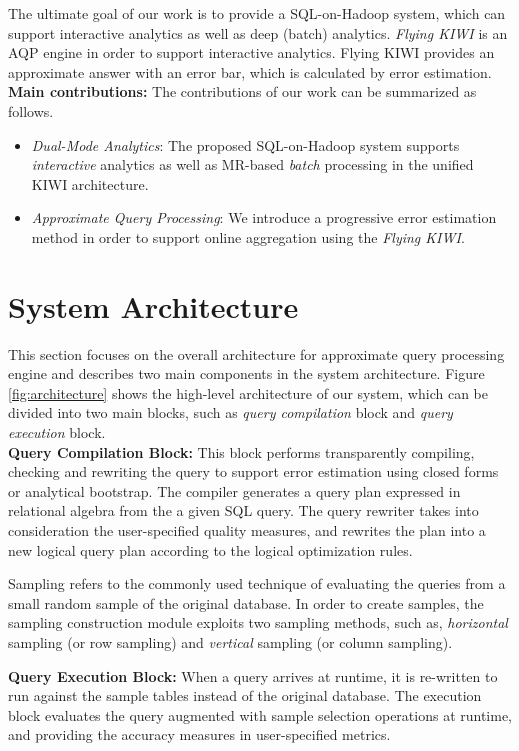 \documentclass{sig-alternate-05-2015}
\newcommand{\bi}{\begin{itemize}}
\newcommand{\ei}{\end{itemize}}
\newcommand{\ii}{\item}
\begin{document}
The ultimate goal of our work is to provide a SQL-on-Hadoop system, which can support interactive analytics as well as deep (batch) analytics. \textit{Flying KIWI} is an AQP engine in order to support interactive analytics. Flying KIWI provides an approximate answer with an error bar, which is calculated by error estimation. \\

\noindent
\textbf{Main contributions:} 
The contributions of our work can be summarized as follows. 
\bi
\ii \textit{Dual-Mode Analytics}: 
The proposed SQL-on-Hadoop system supports \textit{interactive} analytics as well as MR-based \textit{batch} processing in the unified KIWI architecture.
\ii \textit{Approximate Query Processing}: 
We introduce a progressive error estimation method in order to support online aggregation using the \textit{Flying KIWI}.
\ei

\section{System Architecture}
This section focuses on the overall architecture for approximate query processing engine 
and describes two main components in the system architecture. 
Figure \ref{fig:architecture} shows the high-level architecture of our system, which can be divided into two main blocks, such as \textit{query compilation} block and \textit{query execution} block.\\

\noindent
\textbf{Query Compilation Block:} 
This block performs transparently compiling, checking and rewriting the query to support error estimation using closed forms or analytical bootstrap. The compiler generates a query plan expressed in relational algebra from the a given SQL query. 
The query rewriter takes into consideration the user-specified quality measures, and rewrites the plan into a new logical query plan according to the logical optimization rules. 

Sampling refers to the commonly used technique of evaluating the queries from a small random sample of the original database. In order to create samples, the sampling construction module exploits two sampling methods, such as, \textit{horizontal} sampling (or row sampling) and \textit{vertical} sampling (or column sampling).

\noindent
\textbf{Query Execution Block:} 
When a query arrives at runtime, it is re-written to run against the sample tables instead of the original database.
The execution block evaluates the query augmented with sample selection operations at runtime, 
and providing the accuracy measures in user-specified metrics. 
\end{document}
